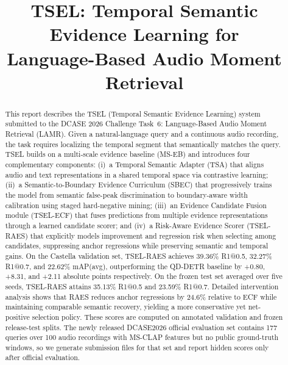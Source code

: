 \documentclass[conference]{IEEEtran}
\begin{document}
\title{TSEL: Temporal Semantic Evidence Learning for\\Language-Based Audio Moment Retrieval}

\author{
}

\maketitle

\begin{abstract}
This report describes the TSEL (Temporal Semantic Evidence Learning) system
submitted to the DCASE 2026 Challenge Task~6: Language-Based Audio Moment
Retrieval (LAMR).  Given a natural-language query and a continuous audio
recording, the task requires localizing the temporal segment that semantically
matches the query.  TSEL builds on a multi-scale evidence baseline (MS-EB) and
introduces four complementary components: (i)~a Temporal Semantic Adapter (TSA)
that aligns audio and text representations in a shared temporal space via
contrastive learning; (ii)~a Semantic-to-Boundary Evidence Curriculum (SBEC)
that progressively trains the model from semantic false-peak discrimination to
boundary-aware width calibration using staged hard-negative mining; (iii)~an
Evidence Candidate Fusion module (TSEL-ECF) that fuses predictions from
multiple evidence representations through a learned candidate scorer; and
(iv)~a Risk-Aware Evidence Scorer (TSEL-RAES) that explicitly models
improvement and regression risk when selecting among candidates, suppressing
anchor regressions while preserving semantic and temporal gains.  On the
Castella validation set, TSEL-RAES achieves 39.36\% R1@0.5, 32.27\% R1@0.7,
and 22.62\% mAP(avg), outperforming the QD-DETR baseline by +0.80, +8.31, and
+2.11 absolute points respectively.  On the frozen test set averaged over five
seeds, TSEL-RAES attains 35.13\% R1@0.5 and 23.59\% R1@0.7.  Detailed
intervention analysis shows that RAES reduces anchor regressions by 24.6\%
relative to ECF while maintaining comparable semantic recovery, yielding a
more conservative yet net-positive selection policy.  These scores are computed
on annotated validation and frozen release-test splits.  The newly released
DCASE2026 official evaluation set contains 177 queries over 100 audio
recordings with MS-CLAP features but no public ground-truth windows, so we
generate submission files for that set and report hidden scores only after
official evaluation.
\end{abstract}
\end{document}
